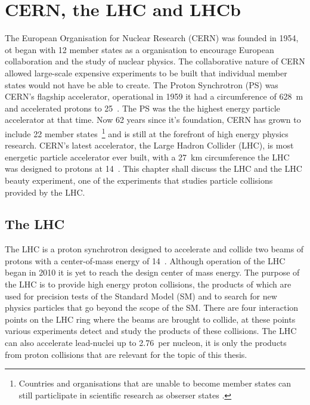 \chapter{CERN, the LHC and LHCb}
\label{CERN_LHC_LHCb}

The European Organisation for Nuclear Research (CERN) was founded in 1954, ot began with 12 member states as a organisation to encourage European collaboration and the study of nuclear physics. The collaborative nature of CERN allowed large-scale expensive experiments to be built that individual member states would not have be able to create. The Proton Synchrotron (PS) was CERN's flagship accelerator, operational in 1959 it had a circumference of 628~m and accelerated protons to 25~\gev. The PS was the the highest energy particle accelerator at that time. Now 62 years since it's foundation, CERN has grown to include 22 member states~\footnote{Countries and organisations that are unable to become member states can still particlipate in scientific research as obserser states \cite{Member_States}.} and is still at the forefront of high energy physics research. CERN’s latest accelerator, the Large Hadron Collider (LHC), is most energetic particle accelerator ever built, with a 27~km circumference the LHC was designed to protons at 14~\tev. This chapter shall discuss the LHC and the LHC beauty experiment, one of the experiments that studies particle collisions provided by the LHC.

\section{The LHC}
\label{LHC}


The LHC is a proton synchrotron designed to accelerate and collide two beams of protons with a center-of-mass energy of 14~\tev. Although operation of the LHC began in 2010 it is yet to reach the design center of mass energy. The purpose of the LHC is to provide high energy proton collisions, the products of which are used for precision tests of the Standard Model (SM) and to search for new physics particles that go beyond the scope of the SM. There are four interaction points on the LHC ring where the beams are brought to collide, at these points various experiments detect and study the products of these collisions. The LHC can also accelerate lead-nuclei up to 2.76~\tev per nucleon, it is only the products from proton collisions that are relevant for the topic of this thesis.

